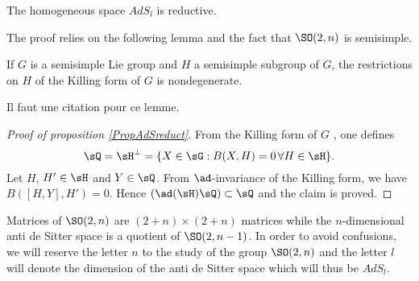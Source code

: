 \begin{proposition}
The homogeneous space $AdS_l$ is reductive.
\label{PropAdSreduct}
\end{proposition}

The proof relies on the following lemma and the fact that $\SO(2,n)$ is semisimple.
\begin{lemma} 
If $G$ is a semisimple Lie group and $H$ a semisimple subgroup of $G$, the restrictions on $H$ of the Killing form of $G$ is nondegenerate.
 \label{lem:Killing_ss_descent}
\end{lemma}

\begin{probleme}
Il faut une citation pour ce lemme.
\label{ProbCitLemDesc}
\end{probleme}

\begin{proof}[Proof of proposition \ref{PropAdSreduct}]
From the Killing form of $G$ , one defines
\[
   \sQ=\sH^{\perp}=\{X\in\sG:B(X,H)=0\,\forall H\in\sH\}.
\]
Let $H$, $H'\in\sH$ and $Y\in\sQ$. From $\ad$-invariance of the Killing form, we have $B([H,Y],H')=0$. Hence $(\ad(\sH)\sQ)\subset \sQ$ and the claim is proved.

\end{proof}

Matrices of $\SO(2,n)$ are $(2+n)\times(2+n)$ matrices while the $n$-dimensional anti de Sitter space is a quotient of $\SO(2,n-1)$. In order to avoid confusions, we will reserve the letter $n$ to the study of the group $\SO(2,n)$ and the letter $l$ will denote the dimension of the anti de Sitter space which will thus be $AdS_l$.

